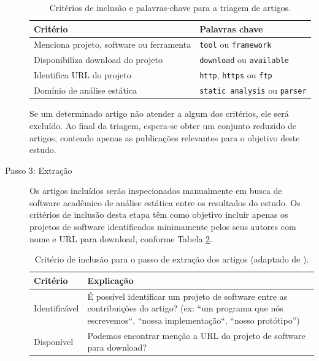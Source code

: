 \begin{description}
\begin{table}[h]
\caption{Critérios de inclusão e palavras-chave para a triagem de artigos.}
\centering
\begin{tabular}{ l l }
  \hline
  Critério                                 & Palavras chave                        \\
  \hline
  Menciona projeto, software ou ferramenta & {\tt tool} ou {\tt framework}         \\
  Disponibiliza download do projeto        & {\tt download} ou {\tt available}     \\
  Identifica URL do projeto                & {\tt http}, {\tt https} ou {\tt ftp}  \\
  Domínio de análise estática              & {\tt static analysis} ou {\tt parser} \\
  \hline
\end{tabular}
\label{criterios-triagem}
\end{table}

Se um determinado artigo não atender a algum dos critérios, ele será
excluído. Ao final da triagem, espera-se obter um conjunto reduzido
de artigos, contendo apenas as publicações relevantes para o objetivo
deste estudo.

  \item [Passo 3: Extração]

Os artigos incluídos serão inspecionados manualmente em busca de software acadêmico de
análise estática entre os resultados do estudo. Os critérios de inclusão desta etapa têm
como objetivo incluir apenas os projetos de software identificados minimamente
pelos seus autores com nome e URL para download, conforme Tabela
\ref{criterios-extracao}.

\begin{table}[h]
\caption{Critério de inclusão para o passo de extração dos artigos (adaptado de ).}
\centering
\begin{tabular}{ l p{12cm} }
  \hline
  Critério         & Explicação \\
  \hline
  Identificável    & É possível identificar um projeto de software entre as contribuições do artigo? (ex: ``um programa que nós escrevemos``, ``nossa implementação``, ``nosso protótipo'') \\
  Disponível       & Podemos encontrar menção a URL do projeto de software para download? \\
  \hline
\end{tabular}
\label{criterios-extracao}
\end{table}


\end{description}
